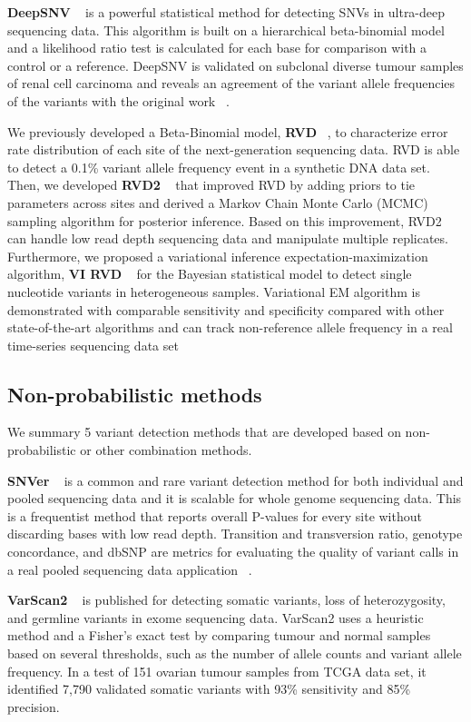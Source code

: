 \documentclass[11pt,reqno]{amsart}
\begin{document}
\textbf{DeepSNV} ~\citep{gerstung2012reliable} is a powerful statistical method for detecting SNVs in ultra-deep sequencing data.
This algorithm is built on a hierarchical beta-binomial model and a likelihood ratio test is calculated for each base for comparison with a control or a reference.
DeepSNV is validated on subclonal diverse tumour samples of renal cell carcinoma and reveals an agreement of the variant allele frequencies of the variants with the original work ~\citep{gerstung2012reliable}.

We previously developed a Beta-Binomial model, \textbf{RVD} ~\citep{Flaherty2012}, to characterize error rate distribution of each site of the next-generation sequencing data.
RVD is able to detect a 0.1\% variant allele frequency event in a synthetic DNA data set.
Then, we developed \textbf{RVD2} ~\citep{He2015} that improved RVD by adding priors to tie parameters across sites and derived a Markov Chain Monte Carlo (MCMC) sampling algorithm for posterior inference.
Based on this improvement, RVD2 can handle low read depth sequencing data and manipulate multiple replicates.
Furthermore, we proposed a variational inference expectation-maximization algorithm, \textbf{VI RVD} ~\citep{zhang2016variational} for the Bayesian statistical model to detect single nucleotide variants in heterogeneous samples.
Variational EM algorithm is demonstrated with comparable sensitivity and specificity compared with other state-of-the-art algorithms and can track non-reference allele frequency in a real time-series sequencing data set


\subsection{Non-probabilistic methods}
We summary 5 variant detection methods that are developed based on non-probabilistic or other combination methods.

\textbf{SNVer} ~\citep{Wei2011} is a common and rare variant detection method for both individual and pooled sequencing data and it is scalable for whole genome sequencing data.
This is a frequentist method that reports overall P-values for every site without discarding bases with low read depth.
Transition and transversion ratio, genotype concordance, and dbSNP are metrics for evaluating the quality of variant calls in a real pooled sequencing data application ~\citep{depristo2011framework}.

\textbf{VarScan2} ~\citep{Koboldt2012} is published for detecting somatic variants, loss of heterozygosity, and germline variants in exome sequencing data.
VarScan2 uses a heuristic method and a Fisher's exact test by comparing tumour and normal samples based on several thresholds, such as the number of allele counts and variant allele frequency.
In a test of 151 ovarian tumour samples from TCGA data set, it identified 7,790 validated somatic variants with 93\% sensitivity and 85\% precision.
\end{document}
